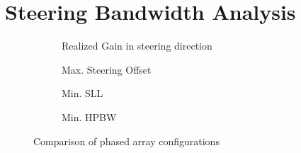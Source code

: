 \section{Steering Bandwidth Analysis}

\begin{figure}[h!]
	\centering
	\captionsetup[subfigure]{justification=centering}
	\captionsetup{justification=centering,margin=2cm}
	\begin{subfigure}[b]{0.49\textwidth}
	    \centering
	    
	    \caption{Realized Gain in steering direction}
	    \label{fig:realized_gain_steering_direction}
	    \vspace*{2mm}
	\end{subfigure}
	\begin{subfigure}[b]{0.49\textwidth}
	    \centering
	    
	    \caption{Max. Steering Offset}
	    \label{fig:steering_offset}
	    \vspace*{2mm}
	\end{subfigure}
	\begin{subfigure}[b]{0.49\textwidth}
	    \centering
        
        \caption{Min. \acrshort{SLL}}
        \label{fig:min_sll}
	    \vspace*{2mm}
    \end{subfigure}
    	\begin{subfigure}[b]{0.49\textwidth}
	    \centering
	    
	    \caption{Min. \acrshort{HPBW}}
	    \label{fig:min_hpbw}
	    \vspace*{2mm}
	\end{subfigure}
	\caption{Comparison of phased array configurations}
	\label{fig:paa_comparison}
\end{figure}


